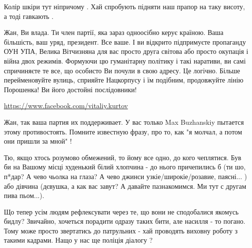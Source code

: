 \begin{itemize}

Колір шкіри тут ніпричому . Хай спробують підняти наш прапор на таку висоту, а тоді гавкають .


Жан, Ви влада. Ти член партії, яка зараз одноосібно керує країною. Ваша
більшість, ваш уряд, президент. Все ваше. І ви відкрито підпримуєте пропаганду
ОУН УПА, Велика Вітчизняна для вас просто друга світова або просто окупація і
війна двох режимів. Формуючи цю гуманітарну політику і такі наративи, ви самі
спричиняєте те все, що особисто Ви почули в свою адресу. Це логічно. Більше
перейменовуйте вулиць, сприяйте Нацкорпусу і їм подібним, продовжуйте лінію
Порошенка! Ви його достойні послідовники!

\url{https://www.facebook.com/vitaliy.kurtov}\par
 

Жан, так ваша партия их поддерживает. У вас только Max Buzhanskiy пытается
этому противостоять. Помните известную фразу, про то, как "я молчал, а потом
они пришли за мной" !


 

Тю, якщо хтось розумово обмежений, то йому все одно, до кого чеплятися. Був би
на Вашому місці худенький білий хлопчина - до нього причепились б (ти шо,
п*дар? А чево чьолка на глаза? А чево джинси узкіе/широкіе/розавие, паясні... )
або дівчина (дєвушка, а как вас завут? А давайте пазнакомимся. Ми тут с другам
пива пьом...).

Що тепер усім людям рефлексувати через те, що вони не сподобалися якомусь
бидлу? Звичайно, хочеться порадити одразу таких бити, але насилля - то погано.
Тому може просто звертатись до патрульних - хай проводять виховну роботу з
такими кадрами. Нащо у нас ще поліція діалогу ?


\end{itemize}
